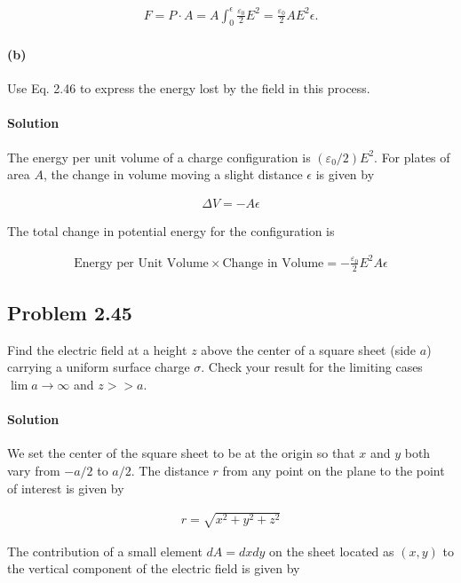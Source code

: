 \documentclass{article}
\begin{document}
\begin{align*}
    F = P\cdot A = A \int_0^{\epsilon} \frac{\varepsilon_0}{2}E^2 = \frac{\varepsilon_0}{2}AE^2\epsilon.
\end{align*}

\paragraph{(b)} Use Eq. 2.46 to express the energy lost by the field in this process.

\paragraph{Solution} The energy per unit volume of a charge configuration is $(\varepsilon_0/2)E^2$. For plates of area $A$, the change in volume moving a slight distance $\epsilon$ is given by

\begin{align*}
    \Delta V = -A\epsilon
\end{align*}

The total change in potential energy for the configuration is 

\begin{align*}
    \text{Energy per Unit Volume} \times \text{Change in Volume} = -\frac{\varepsilon_0}{2}E^2A\epsilon
\end{align*}

\newpage

\subsection*{Problem 2.45} Find the electric field at a height $z$ above the center of a square sheet (side $a$) carrying a uniform surface charge $\sigma$. Check your result for the limiting cases $\lim {a\rightarrow \infty}$ and $z >> a$.

\paragraph{Solution} We set the center of the square sheet to be at the origin so that $x$ and $y$ both vary from $-a/2$ to $a/2$. The distance $r$ from any point on the plane to the point of interest is given by 

\begin{align*}
    r = \sqrt{x^2 + y^2 + z^2}
\end{align*}

The contribution of a small element $dA = dxdy$ on the sheet located as $(x, y)$ to the vertical component of the electric field is given by 
\end{document}
